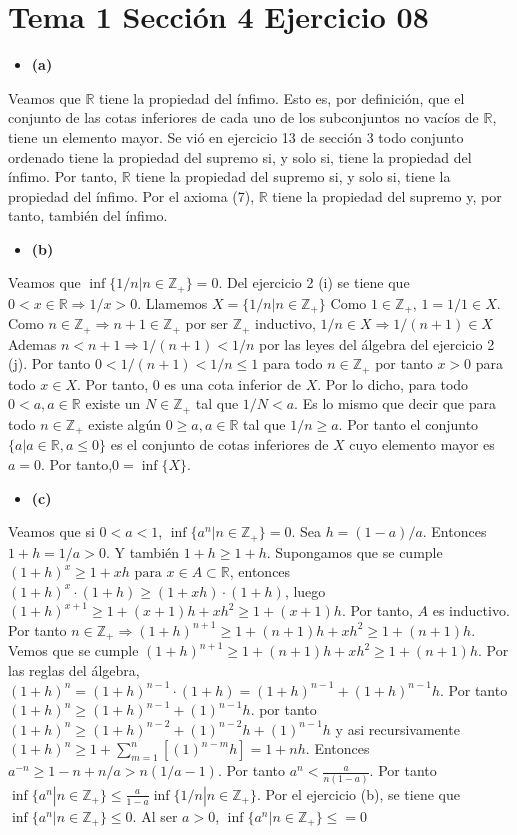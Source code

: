\documentclass{article}
\begin{document}
\section{Tema 1 Sección 4 Ejercicio 08}
\begin{itemize}
\item\bf (a)\rm
\end{itemize}
Veamos que \(\mathbb{R}\) tiene la propiedad del ínfimo. Esto es, por definición, que el conjunto de las cotas inferiores de cada uno de los subconjuntos no vacíos de \(\mathbb{R}\), tiene un elemento mayor. Se vió en ejercicio 13 de sección 3 todo conjunto ordenado tiene la propiedad del supremo si, y solo si, tiene la propiedad del ínfimo. Por tanto, $\mathbb{R}$ tiene la propiedad del supremo si, y solo si, tiene la propiedad del ínfimo. Por el axioma (7), $\mathbb{R}$ tiene la propiedad del supremo y, por tanto, también del ínfimo.
\begin{itemize}
\item\bf (b)\rm
\end{itemize}
Veamos que $\inf\{1/n|n\in \mathbb{Z}_{+}\}=0$. Del ejercicio 2 (i) se tiene que $0<x\in \mathbb{R}\Rightarrow 1/x>0$. Llamemos $X=\{1/n|n\in \mathbb{Z}_{+}\}$ Como $1\in \mathbb{Z}_{+}$,  $1=1/1\in X$. Como $n\in \mathbb{Z}_{+}\Rightarrow n+1\in \mathbb{Z}_{+}$ por ser $\mathbb{Z}_{+}$ inductivo, $1/n\in X \Rightarrow 1/(n+1)\in X$ Ademas $n<n+1\Rightarrow 1/(n+1)<1/n$ por las leyes del álgebra del ejercicio 2 (j). Por tanto $0<1/(n+1)<1/n\leq 1$ para todo $n\in\mathbb{Z}_{+}$ por tanto $x>0$ para todo $x \in X $. Por tanto, 0 es una cota inferior de $X$. Por lo dicho, para todo $0< a, a\in \mathbb{R}$ existe un $N\in \mathbb{Z}_{+}$ tal que $1/N<a$. Es lo mismo que decir que para todo $n\in \mathbb{Z}_{+}$ existe algún $0\geq a, a\in \mathbb{R}$ tal que $1/n \geq a$. Por tanto el conjunto $\{a|a\in \mathbb{R}, a\leq 0\}$ es el conjunto de cotas inferiores de $X$ cuyo elemento mayor es $a=0$. Por tanto,$ 0= \inf\{X\}$.
\begin{itemize}
\item \bf (c) \rm
\end{itemize}
Veamos que si $0<a<1$, $\inf\{a^{n}|n\in \mathbb{Z}_{+}\}=0$. Sea $h=(1-a)/a$. Entonces $1+h=1/a>0$. Y también $1+h\geq 1+h$. Supongamos que se cumple $(1+h)^{x}\geq 1+xh \text{ para } x\in A\subset\mathbb{R}$, entonces  $(1+h)^{x}\cdot (1+h)\geq (1+xh)\cdot(1+h)$, luego  $(1+h)^{x+1}\geq 1+(x+1)h+ xh^2\geq 1+(x+1)h$. Por tanto, $A$ es inductivo. Por tanto $n\in\mathbb{Z}_{+}\Rightarrow (1+h)^{n+1}\geq 1+(n+1)h+ xh^2\geq 1+(n+1)h$. Vemos que se cumple $(1+h)^{n+1}\geq 1+(n+1)h+ xh^2\geq 1+(n+1)h$. Por las reglas del álgebra, $(1+h)^{n}=(1+h)^{n-1}\cdot(1+h) =(1+h)^{n-1}+(1+h)^{n-1}h$. Por tanto  $(1+h)^{n}\geq (1+h)^{n-1}+(1)^{n-1}h$. por tanto $(1+h)^{n}\geq (1+h)^{n-2}+(1)^{n-2}h+(1)^{n-1}h$ y asi recursivamente $(1+h)^{n}\geq 1+ \sum_{m=1}^{n}[(1)^{n-m}h]=1+nh$. Entonces $a^{-n}\geq 1-n+n/a>n(1/a-1)$. Por tanto $a^{n} < \frac{a}{n(1-a)}$. Por tanto $\inf\{a^{n}|n\in \mathbb{Z}_{+}\}\leq\frac{a}{1-a}\inf\{1/n|n\in \mathbb{Z}_{+}\}$. Por el ejercicio (b), se tiene que $\inf\{a^{n}|n\in \mathbb{Z}_{+}\}\leq 0$. Al ser $a>0$, $\inf\{a^{n}|n\in \mathbb{Z}_{+}\}\leq = 0$ 
\end{document}
